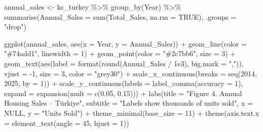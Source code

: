 \documentclass[
  11pt,
  a4paper,
]{article}
\newenvironment{Shaded}{\begin{snugshade}}{\end{snugshade}}
\newcommand{\AttributeTok}[1]{\textcolor[rgb]{0.40,0.45,0.13}{#1}}
\newcommand{\ConstantTok}[1]{\textcolor[rgb]{0.56,0.35,0.01}{#1}}
\newcommand{\DecValTok}[1]{\textcolor[rgb]{0.68,0.00,0.00}{#1}}
\newcommand{\FloatTok}[1]{\textcolor[rgb]{0.68,0.00,0.00}{#1}}
\newcommand{\FunctionTok}[1]{\textcolor[rgb]{0.28,0.35,0.67}{#1}}
\newcommand{\NormalTok}[1]{\textcolor[rgb]{0.00,0.23,0.31}{#1}}
\newcommand{\OtherTok}[1]{\textcolor[rgb]{0.00,0.23,0.31}{#1}}
\newcommand{\SpecialCharTok}[1]{\textcolor[rgb]{0.37,0.37,0.37}{#1}}
\newcommand{\StringTok}[1]{\textcolor[rgb]{0.13,0.47,0.30}{#1}}
\begin{document}
\begin{Shaded}
\begin{Highlighting}[]
\NormalTok{annual\_sales }\OtherTok{\textless{}{-}}\NormalTok{ ks\_turkey }\SpecialCharTok{\%\textgreater{}\%}
  \FunctionTok{group\_by}\NormalTok{(Year) }\SpecialCharTok{\%\textgreater{}\%}
  \FunctionTok{summarise}\NormalTok{(}\AttributeTok{Annual\_Sales =} \FunctionTok{sum}\NormalTok{(Total\_Sales, }\AttributeTok{na.rm =} \ConstantTok{TRUE}\NormalTok{), }\AttributeTok{.groups =} \StringTok{"drop"}\NormalTok{)}

\FunctionTok{ggplot}\NormalTok{(annual\_sales, }\FunctionTok{aes}\NormalTok{(}\AttributeTok{x =}\NormalTok{ Year, }\AttributeTok{y =}\NormalTok{ Annual\_Sales)) }\SpecialCharTok{+}
  \FunctionTok{geom\_line}\NormalTok{(}\AttributeTok{color =} \StringTok{"\#74add1"}\NormalTok{, }\AttributeTok{linewidth =} \DecValTok{1}\NormalTok{) }\SpecialCharTok{+}
  \FunctionTok{geom\_point}\NormalTok{(}\AttributeTok{color =} \StringTok{"\#2c7bb6"}\NormalTok{, }\AttributeTok{size =} \DecValTok{3}\NormalTok{) }\SpecialCharTok{+}
  \FunctionTok{geom\_text}\NormalTok{(}\FunctionTok{aes}\NormalTok{(}\AttributeTok{label =} \FunctionTok{format}\NormalTok{(}\FunctionTok{round}\NormalTok{(Annual\_Sales }\SpecialCharTok{/} \FloatTok{1e3}\NormalTok{), }\AttributeTok{big.mark =} \StringTok{","}\NormalTok{)),}
            \AttributeTok{vjust =} \SpecialCharTok{{-}}\DecValTok{1}\NormalTok{, }\AttributeTok{size =} \DecValTok{3}\NormalTok{, }\AttributeTok{color =} \StringTok{"grey30"}\NormalTok{) }\SpecialCharTok{+}
  \FunctionTok{scale\_x\_continuous}\NormalTok{(}\AttributeTok{breaks =} \FunctionTok{seq}\NormalTok{(}\DecValTok{2014}\NormalTok{, }\DecValTok{2025}\NormalTok{, }\AttributeTok{by =} \DecValTok{1}\NormalTok{)) }\SpecialCharTok{+}
  \FunctionTok{scale\_y\_continuous}\NormalTok{(}\AttributeTok{labels =} \FunctionTok{label\_comma}\NormalTok{(}\AttributeTok{accuracy =} \DecValTok{1}\NormalTok{),}
                     \AttributeTok{expand =} \FunctionTok{expansion}\NormalTok{(}\AttributeTok{mult =} \FunctionTok{c}\NormalTok{(}\FloatTok{0.05}\NormalTok{, }\FloatTok{0.15}\NormalTok{))) }\SpecialCharTok{+}
  \FunctionTok{labs}\NormalTok{(}\AttributeTok{title =} \StringTok{"Figure 4. Annual Housing Sales – Türkiye"}\NormalTok{,}
       \AttributeTok{subtitle =} \StringTok{"Labels show thousands of units sold"}\NormalTok{,}
       \AttributeTok{x =} \ConstantTok{NULL}\NormalTok{, }\AttributeTok{y =} \StringTok{"Units Sold"}\NormalTok{) }\SpecialCharTok{+}
  \FunctionTok{theme\_minimal}\NormalTok{(}\AttributeTok{base\_size =} \DecValTok{11}\NormalTok{) }\SpecialCharTok{+}
  \FunctionTok{theme}\NormalTok{(}\AttributeTok{axis.text.x =} \FunctionTok{element\_text}\NormalTok{(}\AttributeTok{angle =} \DecValTok{45}\NormalTok{, }\AttributeTok{hjust =} \DecValTok{1}\NormalTok{))}
\end{Highlighting}
\end{Shaded}
\end{document}
